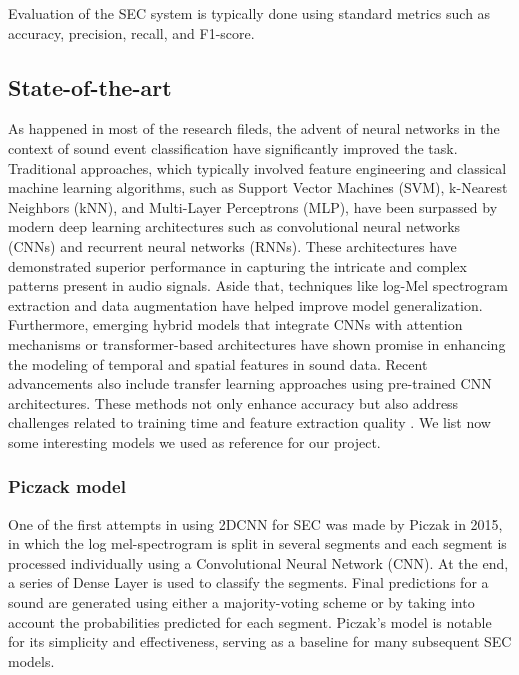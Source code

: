\documentclass{article}
\begin{document}
\begin{sloppy}
Evaluation of the SEC system is typically done using standard metrics such as accuracy, precision, recall, and F1-score.

\subsection{State-of-the-art}
\label{sec:state_of_the_art}
As happened in most of the research fileds, the advent of neural networks in the context of sound event classification have significantly improved the task.
Traditional approaches, which typically involved feature engineering and classical machine learning algorithms, such as Support Vector Machines (SVM),
k-Nearest Neighbors (kNN), and Multi-Layer Perceptrons (MLP), have been surpassed by
modern deep learning architectures such as convolutional neural networks (CNNs) and recurrent neural networks (RNNs). 
These architectures have demonstrated superior performance in capturing the intricate and complex patterns present in audio signals.
Aside that,  techniques like log-Mel spectrogram extraction and data augmentation have helped improve model
generalization. Furthermore, emerging hybrid
models that integrate CNNs with attention mechanisms or transformer-based architectures have shown promise in enhancing the modeling of temporal
and spatial features in sound data. Recent advancements also include transfer learning approaches using pre-trained
CNN architectures. These methods not only enhance accuracy but also address challenges related to training time
and feature extraction quality \cite{electronics11152279, ReviewSoundEvent2025}.
We list now some interesting models we used as reference for our project.


\subsubsection{Piczack model}
\label{sec:piczack_model}
One of the first attempts in using 2DCNN for SEC was made by Piczak \cite{Piczak2015environmental} in 2015, in which the log mel-spectrogram is split in several segments
and each segment is processed individually using a Convolutional Neural Network (CNN). At the end, a series of Dense Layer is used to classify the segments.
Final predictions for a sound are generated using either a majority-voting scheme or by taking into account the
probabilities predicted for each segment. Piczak's model is notable for its simplicity and effectiveness, serving as a baseline for many subsequent SEC models.


\end{sloppy}
\end{document}
